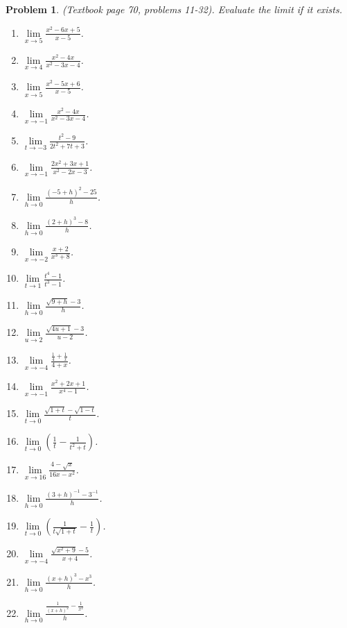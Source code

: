 \documentclass{article}
\newtheorem{problem}{Problem}
\begin{document}
\begin{problem}(Textbook page 70, problems 11-32). 
Evaluate the limit if it exists.
\begin{multicols}{2}
\begin{enumerate}
\item $\displaystyle\lim\limits_{x\to 5}\frac{x^2-6x+5}{x-5} $.
\item $\displaystyle\lim\limits_{x\to 4}\frac{x^2-4x}{x^2-3x-4} $.
\item $\displaystyle\lim\limits_{x\to 5}\frac{x^2-5x+6}{x-5} $.
\item $\displaystyle\lim\limits_{x\to -1}\frac{x^2-4x}{x^{2}-3x-4} $.
\item $\displaystyle\lim\limits_{t\to -3}\frac{t^2-9}{2t^2+7t+3} $.
\item $\displaystyle\lim\limits_{x\to -1}\frac{2x^2+3x+1}{x^2-2x-3} $.
\item $\displaystyle\lim\limits_{h\to 0}\frac{(-5+h)^2-25}{h} $.
\item $\displaystyle\lim\limits_{h\to 0}\frac{(2+h)^3-8}{h} $.
\item $\displaystyle\lim\limits_{x\to -2}\frac{x+2}{x^3+8} $.
\item $\displaystyle\lim\limits_{t\to 1}\frac{t^4-1}{t^3-1} $.
\item $\displaystyle\lim\limits_{h\to 0}\frac{\sqrt{9+h}-3}{h} $.
\item $\displaystyle\lim\limits_{u\to 2} \frac{\sqrt{4u+1}-3}{u-2}$.
\item $\displaystyle\lim\limits_{x\to -4} \frac{\frac{1}{4}+ \frac{1}{x}} {4+x}$.
\item $\displaystyle\lim\limits_{x\to -1} \frac{x^2+2x+1}{x^4-1}$.
\item $\displaystyle\lim\limits_{t\to 0} \frac{\sqrt{1+t}- \sqrt{1-t}}{t}$.
\item $\displaystyle\lim\limits_{t\to 0}\left(\frac{1}t -\frac{1}{t^2+t}\right)$.
\item $\displaystyle\lim\limits_{x\to 16} \frac{4-\sqrt{x}}{16x-x^2}$.
\item $\displaystyle\lim\limits_{h \to 0}\frac{(3+h)^{-1}-3^{-1}}{h} $.
\item $\displaystyle\lim\limits_{t\to 0} \left(\frac{1}{t\sqrt{1+t}}-\frac{1}{t} \right)$.
\item $\displaystyle\lim\limits_{x\to -4} \frac{\sqrt{x^2+9}-5}{x+4}$.
\item $\displaystyle\lim\limits_{h\to 0}\frac{(x+h)^3-x^3}{h} $.
\item $\displaystyle\lim\limits_{h\to 0}\frac{\frac{1}{(x+h)^2}-\frac{1}{x^2}}{h} $.
\end{enumerate}
\end{multicols}
\end{problem}
\end{document}
